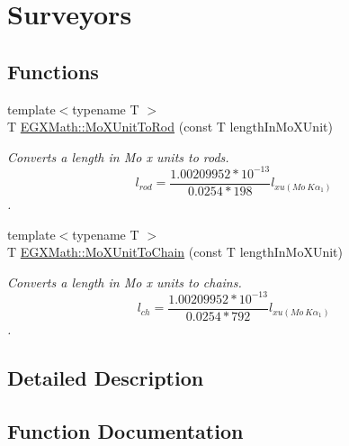 \hypertarget{group___e_g_x_math-_conversions-_length_conversions-_non-_s_i-_mo_x_unit-_surveyors}{}\section{Surveyors}
\label{group___e_g_x_math-_conversions-_length_conversions-_non-_s_i-_mo_x_unit-_surveyors}
\subsection*{Functions}
\begin{DoxyCompactItemize}
\item 
{\footnotesize template$<$typename T $>$ }\\T \mbox{\hyperlink{group___e_g_x_math-_conversions-_length_conversions-_non-_s_i-_mo_x_unit-_surveyors_ga087c126bbeacfc3f9786ce20c1d9c2e1}{E\+G\+X\+Math\+::\+Mo\+X\+Unit\+To\+Rod}} (const T length\+In\+Mo\+X\+Unit)
\begin{DoxyCompactList}\small\item\em Converts a length in Mo x units to rods. \[ l_{rod}= \frac{1.00209952*10^{-13}}{0.0254 * 198} l_{xu(Mo\ K\alpha_1)} \]. \end{DoxyCompactList}\item 
{\footnotesize template$<$typename T $>$ }\\T \mbox{\hyperlink{group___e_g_x_math-_conversions-_length_conversions-_non-_s_i-_mo_x_unit-_surveyors_ga07a643eb483183e8d391856d32f5a519}{E\+G\+X\+Math\+::\+Mo\+X\+Unit\+To\+Chain}} (const T length\+In\+Mo\+X\+Unit)
\begin{DoxyCompactList}\small\item\em Converts a length in Mo x units to chains. \[ l_{ch}= \frac{1.00209952*10^{-13}}{0.0254 * 792} l_{xu(Mo\ K\alpha_1)} \]. \end{DoxyCompactList}\end{DoxyCompactItemize}


\subsection{Detailed Description}


\subsection{Function Documentation}
\mbox{\label{group___e_g_x_math-_conversions-_length_conversions-_non-_s_i-_mo_x_unit-_surveyors_ga07a643eb483183e8d391856d32f5a519}} 
